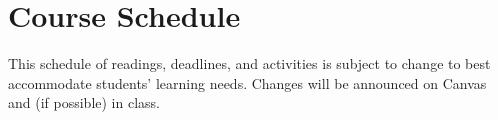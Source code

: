 \documentclass[11pt]{article}
\begin{document}

\newpage
\section*{Course Schedule}

This schedule of readings, deadlines, and activities is subject to change to best accommodate students' learning needs. Changes will be announced on Canvas and (if possible) in class.
\end{document}
